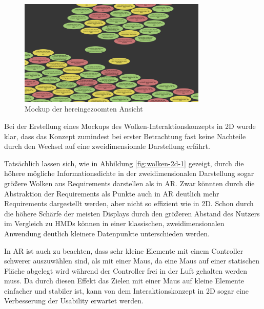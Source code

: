 \begin{figure}[H]
    \centering
    \includegraphics[width=0.8\textwidth]{images/FigmaWolkenCloseup.png}
    \caption{Mockup der hereingezoomten Ansicht}
    \label{fig:wolken-2d-2}
\end{figure}

Bei der Erstellung eines Mockups des Wolken-Interaktionskonzepts in 2D wurde klar, dass das Konzept zumindest bei erster Betrachtung fast keine Nachteile durch den Wechsel auf eine zweidimensionale Darstellung erfährt.

Tatsächlich lassen sich, wie in Abbildung \ref{fig:wolken-2d-1} gezeigt, durch die höhere mögliche Informationsdichte in der zweidimensionalen Darstellung sogar größere Wolken aus Requirements darstellen als in AR.
Zwar könnten durch die Abstraktion der Requirements als Punkte auch in AR deutlich mehr Requirements dargestellt werden, aber nicht so effizient wie in 2D.
Schon durch die höhere Schärfe der meisten Displays durch den größeren Abstand des Nutzers im Vergleich zu HMDs können in einer klassischen, zweidimensionalen Anwendung deutlich kleinere Datenpunkte unterschieden werden.

In AR ist auch zu beachten, dass sehr kleine Elemente mit einem Controller schwerer auszuwählen sind, als mit einer Maus, da eine Maus auf einer statischen Fläche abgelegt wird während der Controller frei in der Luft gehalten werden muss.
Da durch diesen Effekt das Zielen mit einer Maus auf kleine Elemente einfacher und stabiler ist, kann von dem Interaktionskonzept in 2D sogar eine Verbesserung der Usability erwartet werden.

